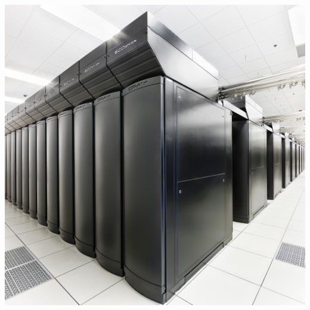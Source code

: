 {\begin{center}
{\begin{minipage}{.3\linewidth}
\begin{tcolorbox}[colback=white, colframe=black, width=\linewidth, height=1.35\linewidth, boxrule=1pt]
                \includegraphics[width=\textwidth]{img/bw_cropped.jpg}
                \vfill
            \end{tcolorbox}
        \end{minipage}
    }


\end{center}}
